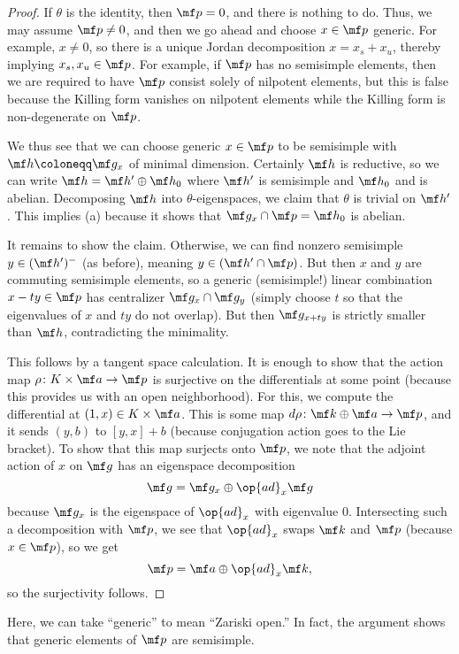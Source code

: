 \documentclass[../notes.tex]{subfiles}
\begin{document}
\begin{proof}
	If $\theta$ is the identity, then $\mf p=0$, and there is nothing to do. Thus, we may assume $\mf p\ne0$, and then we go ahead and choose $x\in\mf p$ generic. For example, $x\ne0$, so there is a unique Jordan decomposition $x=x_s+x_u$, thereby implying $x_s,x_u\in\mf p$. For example, if $\mf p$ has no semisimple elements, then we are required to have $\mf p$ consist solely of nilpotent elements, but this is false because the Killing form vanishes on nilpotent elements while the Killing form is non-degenerate on $\mf p$.

	We thus see that we can choose generic $x\in\mf p$ to be semisimple with $\mf h\coloneqq\mf g_x$ of minimal dimension. Certainly $\mf h$ is reductive, so we can write $\mf h=\mf h'\oplus\mf h_0$ where $\mf h'$ is semisimple and $\mf h_0$ and is abelian. Decomposing $\mf h$ into $\theta$-eigenspaces, we claim that $\theta$ is trivial on $\mf h'$. This implies (a) because it shows that $\mf g_x\cap\mf p=\mf h_0$ is abelian.
	
	It remains to show the claim. Otherwise, we can find nonzero semisimple $y\in(\mf h')^-$ (as before), meaning $y\in(\mf h'\cap\mf p)$. But then $x$ and $y$ are commuting semisimple elements, so a generic (semisimple!) linear combination $x-ty\in\mf p$ has centralizer $\mf g_x\cap\mf g_y$ (simply choose $t$ so that the eigenvalues of $x$ and $ty$ do not overlap). But then $\mf g_{x+ty}$ is strictly smaller than $\mf h$, contradicting the minimality.

	This follows by a tangent space calculation. It is enough to show that the action map $\rho\colon K\times\mf a\to\mf p$ is surjective on the differentials at some point (because this provides us with an open neighborhood). For this, we compute the differential at $(1,x)\in K\times\mf a$. This is some map $d\rho\colon\mf k\oplus\mf a\to\mf p$, and it sends $(y,b)$ to $[y,x]+b$ (because conjugation action goes to the Lie bracket). To show that this map surjects onto $\mf p$, we note that the adjoint action of $x$ on $\mf g$ has an eigenspace decomposition
	\[\mf g=\mf g_x\oplus\op{ad}_x\mf g\]
	because $\mf g_x$ is the eigenspace of $\op{ad}_x$ with eigenvalue $0$. Intersecting such a decomposition with $\mf p$, we see that $\op{ad}_x$ swaps $\mf k$ and $\mf p$ (because $x\in\mf p$), so we get
	\[\mf p=\mf a\oplus\op{ad}_x\mf k,\]
	so the surjectivity follows.
\end{proof}
\begin{remark}
	Here, we can take ``generic'' to mean ``Zariski open.'' In fact, the argument shows that generic elements of $\mf p$ are semisimple.
\end{remark}
\end{document}
